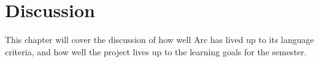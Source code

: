 \chapter{Discussion}\label{cha:discussion}

This chapter will cover the discussion of how well Arc has lived up to its language criteria, and how well the project lives up to the learning goals for the semester.




%

